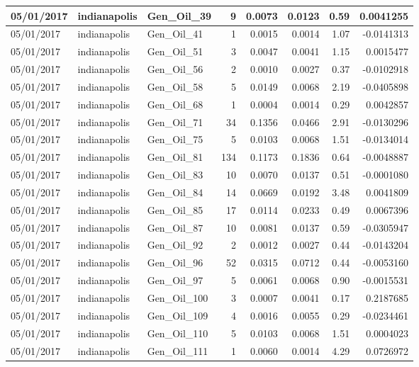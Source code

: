 \documentclass[
  letterpaper,
  DIV=11,
  numbers=noendperiod]{scrartcl}
\begin{document}
\begin{tabular}{l|l|l|r|r|r|r|r}
\hline
05/01/2017 & indianapolis & Gen\_Oil\_39 & 9 & 0.0073 & 0.0123 & 0.59 & 0.0041255\\
\hline
05/01/2017 & indianapolis & Gen\_Oil\_41 & 1 & 0.0015 & 0.0014 & 1.07 & -0.0141313\\
\hline
05/01/2017 & indianapolis & Gen\_Oil\_51 & 3 & 0.0047 & 0.0041 & 1.15 & 0.0015477\\
\hline
05/01/2017 & indianapolis & Gen\_Oil\_56 & 2 & 0.0010 & 0.0027 & 0.37 & -0.0102918\\
\hline
05/01/2017 & indianapolis & Gen\_Oil\_58 & 5 & 0.0149 & 0.0068 & 2.19 & -0.0405898\\
\hline
05/01/2017 & indianapolis & Gen\_Oil\_68 & 1 & 0.0004 & 0.0014 & 0.29 & 0.0042857\\
\hline
05/01/2017 & indianapolis & Gen\_Oil\_71 & 34 & 0.1356 & 0.0466 & 2.91 & -0.0130296\\
\hline
05/01/2017 & indianapolis & Gen\_Oil\_75 & 5 & 0.0103 & 0.0068 & 1.51 & -0.0134014\\
\hline
05/01/2017 & indianapolis & Gen\_Oil\_81 & 134 & 0.1173 & 0.1836 & 0.64 & -0.0048887\\
\hline
05/01/2017 & indianapolis & Gen\_Oil\_83 & 10 & 0.0070 & 0.0137 & 0.51 & -0.0001080\\
\hline
05/01/2017 & indianapolis & Gen\_Oil\_84 & 14 & 0.0669 & 0.0192 & 3.48 & 0.0041809\\
\hline
05/01/2017 & indianapolis & Gen\_Oil\_85 & 17 & 0.0114 & 0.0233 & 0.49 & 0.0067396\\
\hline
05/01/2017 & indianapolis & Gen\_Oil\_87 & 10 & 0.0081 & 0.0137 & 0.59 & -0.0305947\\
\hline
05/01/2017 & indianapolis & Gen\_Oil\_92 & 2 & 0.0012 & 0.0027 & 0.44 & -0.0143204\\
\hline
05/01/2017 & indianapolis & Gen\_Oil\_96 & 52 & 0.0315 & 0.0712 & 0.44 & -0.0053160\\
\hline
05/01/2017 & indianapolis & Gen\_Oil\_97 & 5 & 0.0061 & 0.0068 & 0.90 & -0.0015531\\
\hline
05/01/2017 & indianapolis & Gen\_Oil\_100 & 3 & 0.0007 & 0.0041 & 0.17 & 0.2187685\\
\hline
05/01/2017 & indianapolis & Gen\_Oil\_109 & 4 & 0.0016 & 0.0055 & 0.29 & -0.0234461\\
\hline
05/01/2017 & indianapolis & Gen\_Oil\_110 & 5 & 0.0103 & 0.0068 & 1.51 & 0.0004023\\
\hline
05/01/2017 & indianapolis & Gen\_Oil\_111 & 1 & 0.0060 & 0.0014 & 4.29 & 0.0726972\\

\end{tabular}
\end{document}
